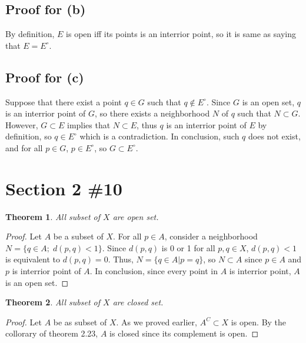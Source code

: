 \documentclass{scrartcl}
\newtheorem{theorem}{Theorem}
\begin{document}
\subsection{Proof for (b)}
By definition, \(E\) is open iff its points is an interrior point, so it is same as saying that \(E = E^\circ\).

\subsection{Proof for (c)}
Suppose that there exist a point \(q \in G\) such that \(q \not \in E^\circ\).
Since \(G\) is an open set, \(q\) is an interrior point of \(G\), so there exists a neighborhood \(N\) of \(q\) such that \(N \subset G\).
However, \(G \subset E\) implies that \(N \subset E\), thus \(q\) is an interrior point of \(E\) by definition, so \(q \in E^\circ\) which is a contradiction.
In conclusion, such \(q\) does not exist, and for all \(p \in G\), \(p \in E^\circ\), so \(G \subset E^\circ\).

\section{Section 2 \#10}
\begin{theorem}
  All subset of \(X\) are open set.
\end{theorem}
\begin{proof}
  Let \(A\) be a subset of \(X\).
  For all \(p \in A\), consider a neighborhood \(N = \{q \in A;\; d(p, q) < 1\}\).
  Since \(d(p, q)\) is 0 or 1 for all \(p, q \in X\), \(d(p, q) < 1\) is equivalent to \(d(p, q) = 0\).
  Thus, \(N = \{q \in A | p = q\}\), so \(N \subset A\) since \(p \in A\) and \(p\) is interrior point of \(A\).
  In conclusion, since every point in \(A\) is interrior point, \(A\) is an open set.
\end{proof}

\begin{theorem}
  All subset of \(X\) are closed set.
\end{theorem}
\begin{proof}
  Let \(A\) be as subset of \(X\).
  As we proved earlier, \(A^C \subset X\) is open.
  By the collorary of theorem 2.23, \(A\) is closed since its complement is open.
\end{proof}
\end{document}
